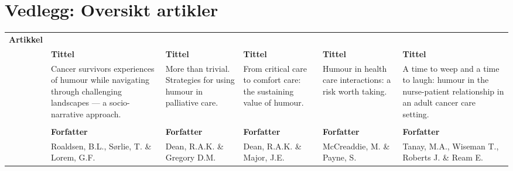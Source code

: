 \chapter{Vedlegg: Oversikt artikler}

\begin{landscape}
  \begin{table}
    \begin{tabularx}{\paperwidth}{
        >{\raggedright\arraybackslash}X
        >{\raggedright\arraybackslash}X
        >{\raggedright\arraybackslash}X
        >{\raggedright\arraybackslash}X
        >{\raggedright\arraybackslash}X
        >{\raggedright\arraybackslash}X}
      \textbf{Artikkel} &
      \\
      &
      \textbf{Tittel} &
      \textbf{Tittel} &
      \textbf{Tittel} &
      \textbf{Tittel} &
      \textbf{Tittel} \\
      &
      Cancer survivors experiences of humour while navigating through challenging landscapes --- a socio-narrative approach. &
      More than trivial. Strategies for using humour in palliative care. &
      From critical care to comfort care: the sustaining value of humour. &
      Humour in health care interactions: a risk worth taking. &
      A time to weep and a time to laugh: humour in the nurse-patient relationship in an adult cancer care setting.
      \\
      \\
      &
      \textbf{Forfatter} &
      \textbf{Forfatter} &
      \textbf{Forfatter} &
      \textbf{Forfatter} &
      \textbf{Forfatter}
      \\
      &
      Roaldsen, B.L., Sørlie, T. \&{} Lorem, G.F. &
      Dean, R.A.K. \&{} Gregory D.M. &
      Dean, R.A.K. \&{} Major, J.E. &
      McCreaddie, M. \&{} Payne, S. &
      Tanay, M.A., Wiseman T., Roberts J. \&{} Ream E.
      \\
    \end{tabularx}
    \label{tabell.artikler.vedlegg}
  \end{table}
\end{landscape}
